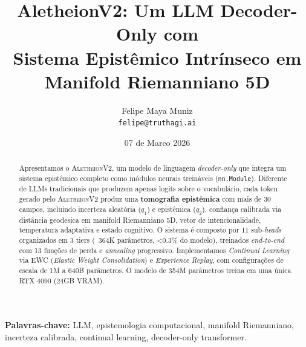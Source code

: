 \documentclass[11pt,a4paper]{article}
\title{
    \textbf{AletheionV2: Um LLM Decoder-Only com\\
    Sistema Epist\^emico Intr\'inseco em\\
    Manifold Riemanniano 5D}
}
\author{
    Felipe Maya Muniz \\
    \texttt{felipe@truthagi.ai}
}
\date{07 de Marco 2026}
\newcommand{\aletheion}{\textsc{AletheionV2}}
\begin{document}
\maketitle

\begin{abstract}
Apresentamos o \aletheion{}, um modelo de linguagem \textit{decoder-only} que integra
um sistema epist\^emico completo como m\'odulos neurais trein\'aveis (\texttt{nn.Module}).
Diferente de LLMs tradicionais que produzem apenas logits sobre o vocabul\'ario,
cada token gerado pelo \aletheion{} produz uma \textbf{tomografia epist\^emica} com mais
de 30 campos, incluindo incerteza aleat\'oria ($q_1$) e epist\^emica ($q_2$),
confian\c{c}a calibrada via dist\^ancia geodesica em manifold Riemanniano 5D,
vetor de intencionalidade, temperatura adaptativa e estado cognitivo.
O sistema \'e composto por 11 sub-\textit{heads} organizados em 3 tiers
(~364K par\^ametros, <0.3\% do modelo), treinados \textit{end-to-end} com
13 fun\c{c}\~oes de perda e \textit{annealing} progressivo. Implementamos
\textit{Continual Learning} via EWC (\textit{Elastic Weight Consolidation}) e
\textit{Experience Replay}, com configura\c{c}\~oes de escala de 1M a 640B par\^ametros.
O modelo de 354M par\^ametros treina em uma \'unica RTX 4090 (24GB VRAM).
\end{abstract}

\textbf{Palavras-chave:} LLM, epistemologia computacional, manifold Riemanniano,
incerteza calibrada, continual learning, decoder-only transformer.

\tableofcontents
\newpage
















\end{document}
